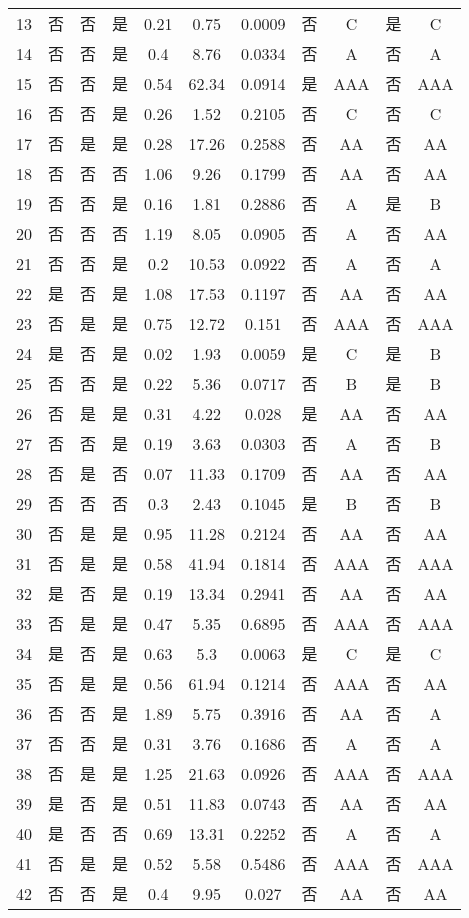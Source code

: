 \begin{table}[h]
{\begin{tabular}{ccccccccccc}
	13	&	否	&	否	&	是	&	0.21	&	0.75	&	0.0009	&	否	&	C	&	是	&	C	\\
	14	&	否	&	否	&	是	&	0.4	&	8.76	&	0.0334	&	否	&	A	&	否	&	A	\\
	15	&	否	&	否	&	是	&	0.54	&	62.34	&	0.0914	&	是	&	AAA	&	否	&	AAA	\\
	16	&	否	&	否	&	是	&	0.26	&	1.52	&	0.2105	&	否	&	C	&	否	&	C	\\
	17	&	否	&	是	&	是	&	0.28	&	17.26	&	0.2588	&	否	&	AA	&	否	&	AA	\\
	18	&	否	&	否	&	否	&	1.06	&	9.26	&	0.1799	&	否	&	AA	&	否	&	AA	\\
	19	&	否	&	否	&	是	&	0.16	&	1.81	&	0.2886	&	否	&	A	&	是	&	B	\\
	20	&	否	&	否	&	否	&	1.19	&	8.05	&	0.0905	&	否	&	A	&	否	&	AA	\\
	21	&	否	&	否	&	是	&	0.2	&	10.53	&	0.0922	&	否	&	A	&	否	&	A	\\
	22	&	是	&	否	&	是	&	1.08	&	17.53	&	0.1197	&	否	&	AA	&	否	&	AA	\\
	23	&	否	&	是	&	是	&	0.75	&	12.72	&	0.151	&	否	&	AAA	&	否	&	AAA	\\
	24	&	是	&	否	&	是	&	0.02	&	1.93	&	0.0059	&	是	&	C	&	是	&	B	\\
	25	&	否	&	否	&	是	&	0.22	&	5.36	&	0.0717	&	否	&	B	&	是	&	B	\\
	26	&	否	&	是	&	是	&	0.31	&	4.22	&	0.028	&	是	&	AA	&	否	&	AA	\\
	27	&	否	&	否	&	是	&	0.19	&	3.63	&	0.0303	&	否	&	A	&	否	&	B	\\
	28	&	否	&	是	&	否	&	0.07	&	11.33	&	0.1709	&	否	&	AA	&	否	&	AA	\\
	29	&	否	&	否	&	否	&	0.3	&	2.43	&	0.1045	&	是	&	B	&	否	&	B	\\
	30	&	否	&	是	&	是	&	0.95	&	11.28	&	0.2124	&	否	&	AA	&	否	&	AA	\\
	31	&	否	&	是	&	是	&	0.58	&	41.94	&	0.1814	&	否	&	AAA	&	否	&	AAA	\\
	32	&	是	&	否	&	是	&	0.19	&	13.34	&	0.2941	&	否	&	AA	&	否	&	AA	\\
	33	&	否	&	是	&	是	&	0.47	&	5.35	&	0.6895	&	否	&	AAA	&	否	&	AAA	\\
	34	&	是	&	否	&	是	&	0.63	&	5.3	&	0.0063	&	是	&	C	&	是	&	C	\\
	35	&	否	&	是	&	是	&	0.56	&	61.94	&	0.1214	&	否	&	AAA	&	否	&	AA	\\
	36	&	否	&	否	&	是	&	1.89	&	5.75	&	0.3916	&	否	&	AA	&	否	&	A	\\
	37	&	否	&	否	&	是	&	0.31	&	3.76	&	0.1686	&	否	&	A	&	否	&	A	\\
	38	&	否	&	是	&	是	&	1.25	&	21.63	&	0.0926	&	否	&	AAA	&	否	&	AAA	\\
	39	&	是	&	否	&	是	&	0.51	&	11.83	&	0.0743	&	否	&	AA	&	否	&	AA	\\
	40	&	是	&	否	&	否	&	0.69	&	13.31	&	0.2252	&	否	&	A	&	否	&	A	\\
	41	&	否	&	是	&	是	&	0.52	&	5.58	&	0.5486	&	否	&	AAA	&	否	&	AAA	\\
	42	&	否	&	否	&	是	&	0.4	&	9.95	&	0.027	&	否	&	AA	&	否	&	AA	\\	
		\bottomrule
	\end{tabular}
}
\end{table}

